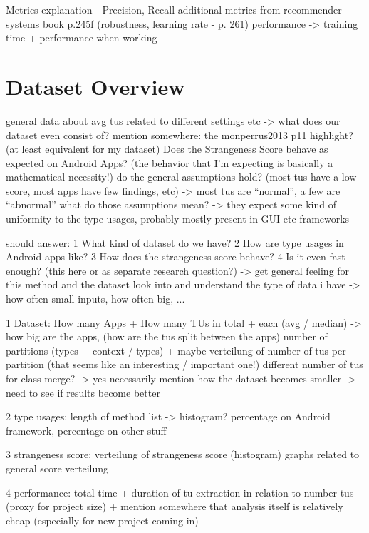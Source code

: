 Metrics explanation - Precision, Recall
    additional metrics from recommender systems book p.245f (robustness, learning rate - p. 261)
    performance -> training time + performance when working

\section{Dataset Overview}

general data about avg tus related to different settings etc -> what does our dataset even consist of?
mention somewhere: the monperrus2013 p11 highlight? (at least equivalent for my dataset)
Does the Strangeness Score behave as expected on Android Apps? (the behavior that I'm expecting is basically a mathematical necessity!)
    do the general assumptions hold? (most tus have a low score, most apps have few findings, etc)
        -> most tus are ``normal'', a few are ``abnormal''
        what do those assumptions mean? -> they expect some kind of uniformity to the type usages, probably mostly present in GUI etc frameworks

should answer:
    1 What kind of dataset do we have?
    2 How are type usages in Android apps like?
    3 How does the strangeness score behave?
    4 Is it even fast enough? (this here or as separate research question?)
-> get general feeling for this method and the dataset
look into and understand the type of data i have -> how often small inputs, how often big, ...

1 Dataset:
    How many Apps + How many TUs in total + each (avg / median) -> how big are the apps, (how are the tus split between the apps)
    number of partitions (types + context / types) + maybe verteilung of number of tus per partition (that seems like an interesting / important one!)
    different number of tus for class merge? -> yes necessarily
        mention how the dataset becomes smaller -> need to see if results become better

2 type usages:
    length of method list -> histogram?
    percentage on Android framework, percentage on other stuff

3 strangeness score:
    verteilung of strangeness score (histogram)
    graphs related to general score verteilung

4 performance:
    total time +
    duration of tu extraction in relation to number tus (proxy for project size)
    + mention somewhere that analysis itself is relatively cheap (especially for new project coming in)

